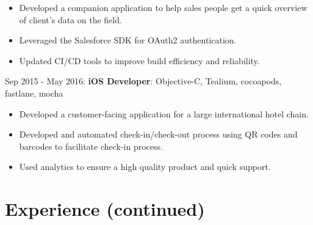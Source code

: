 \documentclass[letterpaper]{template} %
\begin{document}
\begin{twenty}
        {\begin{itemize}
            \item Developed a companion application to help sales people get a quick overview of client's data on the field.
            \item Leveraged the Salesforce SDK for OAuth2 authentication.
            \item Updated CI/CD tools to improve build efficiency and reliability.
        \end{itemize}}
    \twentyitem
    	{}
		{}
        {}
        {}
        {Sep 2015 - May 2016: \textbf{iOS Developer}: Objective-C, Tealium, cocoapods, fastlane, mocha}
        {\begin{itemize}
            \item Developed a customer-facing application for a large international hotel chain.
            \item Developed and automated check-in/check-out process using QR codes and barcodes to facilitate check-in process.
            \item Used analytics to ensure a high quality product and quick support.  
        \end{itemize}}
\end{twenty}

\newpage
\sidebaronly

\section{Experience (continued)}
\end{document}
